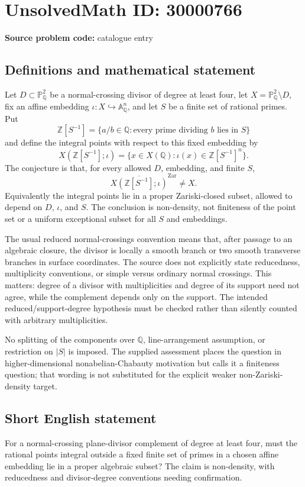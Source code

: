 \documentclass[11pt]{article}
\newcommand{\Z}{\mathbb{Z}}
\newcommand{\Q}{\mathbb{Q}}
\newcommand{\A}{\mathbb{A}}
\newcommand{\PP}{\mathbb{P}}
\begin{document}
\section*{UnsolvedMath ID: 30000766}
\textbf{Source problem code:} catalogue entry
\subsection{Definitions and mathematical statement}
Let $D\subset\PP^2_{\Q}$ be a normal-crossing divisor of degree at least four, let $X=\PP^2_{\Q}\setminus D$, fix an affine embedding $\iota:X\hookrightarrow\A^n_{\Q}$, and let $S$ be a finite set of rational primes. Put
\[
 \Z[S^{-1}]=\{a/b\in\Q:\text{every prime dividing }b\text{ lies in }S\}
\]
and define the integral points with respect to this fixed embedding by
\[
 X(\Z[S^{-1}];\iota)
 =\{x\in X(\Q):\iota(x)\in\Z[S^{-1}]^n\}.
\]
The conjecture is that, for every allowed $D$, embedding, and finite $S$,
\[
 \overline{X(\Z[S^{-1}];\iota)}^{\mathrm{Zar}}\ne X.
\]
Equivalently the integral points lie in a proper Zariski-closed subset, allowed to depend on $D$, $\iota$, and $S$. The conclusion is non-density, not finiteness of the point set or a uniform exceptional subset for all $S$ and embeddings.

The usual reduced normal-crossings convention means that, after passage to an algebraic closure, the divisor is locally a smooth branch or two smooth transverse branches in surface coordinates. The source does not explicitly state reducedness, multiplicity conventions, or simple versus ordinary normal crossings. This matters: degree of a divisor with multiplicities and degree of its support need not agree, while the complement depends only on the support. The intended reduced/support-degree hypothesis must be checked rather than silently counted with arbitrary multiplicities.

No splitting of the components over $\Q$, line-arrangement assumption, or restriction on $|S|$ is imposed. The supplied assessment places the question in higher-dimensional nonabelian-Chabauty motivation but calls it a finiteness question; that wording is not substituted for the explicit weaker non-Zariski-density target.
\subsection{Short English statement}
For a normal-crossing plane-divisor complement of degree at least four, must the rational points integral outside a fixed finite set of primes in a chosen affine embedding lie in a proper algebraic subset? The claim is non-density, with reducedness and divisor-degree conventions needing confirmation.
\end{document}
